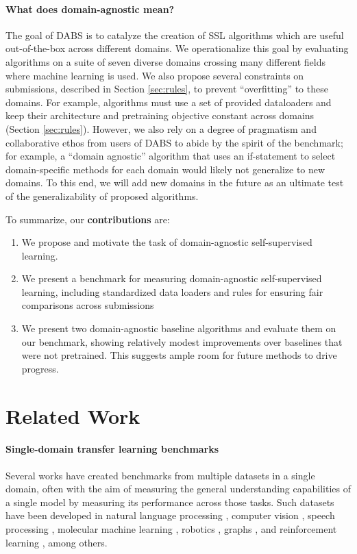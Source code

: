 \documentclass{article}
\begin{document}
\paragraph{What does domain-agnostic mean?}
The goal of DABS is to catalyze the creation of SSL algorithms which are useful out-of-the-box across different domains. We operationalize this goal by evaluating algorithms on a suite of seven diverse domains crossing many different fields where machine learning is used. We also propose several constraints on submissions, described in Section \ref{sec:rules}, to prevent ``overfitting'' to these domains. For example, algorithms must use a set of provided dataloaders and keep their architecture and pretraining objective constant across domains (Section \ref{sec:rules}). However, we also rely on a degree of pragmatism and collaborative ethos from users of DABS to abide by the spirit of the benchmark; for example, a ``domain agnostic'' algorithm that uses an if-statement to select domain-specific methods for each domain would likely not generalize to new domains. To this end, we will add new domains in the future as an ultimate test of the generalizability of proposed algorithms.



To summarize, our \textbf{contributions} are:
\begin{enumerate}
    \item We propose and motivate the task of domain-agnostic self-supervised learning.
    \item We present a benchmark for measuring domain-agnostic self-supervised learning, including standardized data loaders and rules for ensuring fair comparisons across submissions
    \item We present two domain-agnostic baseline algorithms and evaluate them on our benchmark, showing relatively modest improvements over baselines that were not pretrained. This suggests ample room for future methods to drive progress.
\end{enumerate}




\section{Related Work}
\paragraph{Single-domain transfer learning benchmarks}
Several works have created benchmarks from multiple datasets in a single domain, often with the aim of measuring the general understanding capabilities of a single model by measuring its performance across those tasks.  Such datasets have been developed in  natural language processing \citep{Wang2018GLUEAM, Wang2019SuperGLUEAS}, computer vision \citep{triantafillou2019meta, Zhai2019ALS, Zamir2018TaskonomyDT}, speech processing \citep{Shor2020TowardsLA, Yang2021SUPERBSP}, molecular machine learning \citep{Wu2017MoleculeNetAB}, robotics \citep{Yu2019MetaWorldAB}, graphs \citep{Hu2020OpenGB}, and reinforcement learning \citep{bellemare2013arcade}, among others.
\end{document}
